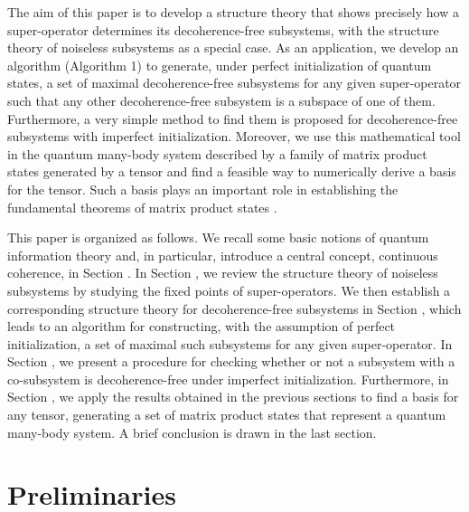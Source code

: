\documentclass[journal]{IEEEtran}
\begin{document}
The aim of this paper is to develop a structure theory that shows precisely how a super-operator determines its decoherence-free subsystems, with the structure theory of noiseless subsystems as a special case. As an application, we develop an algorithm (Algorithm 1) to generate, under perfect initialization of quantum states, a set of maximal decoherence-free subsystems for any given super-operator such that any other decoherence-free subsystem is a subspace of one of them. Furthermore, a very simple  method to find them is proposed for decoherence-free subsystems with imperfect initialization. 
Moreover, we use this mathematical tool in the quantum many-body system described by a family of matrix product states generated by a tensor and find a  feasible way to numerically derive a basis for the tensor. Such a basis plays an important role in establishing the fundamental theorems of matrix product states \cite{cirac2017matrix,cuevas2017irreducible}.

This paper is organized as follows. We recall some basic notions of quantum information theory and, in particular, introduce a central concept, continuous coherence,  in Section \uppercase\expandafter{}. In Section \uppercase\expandafter{}, we review the structure theory of noiseless subsystems by studying the fixed points of super-operators. We then establish a corresponding structure theory for decoherence-free subsystems in Section \uppercase\expandafter{}, which leads to an algorithm for constructing, with the assumption of perfect initialization, a set of maximal such subsystems  for any given super-operator. In Section \uppercase\expandafter{}, we present a procedure for checking whether or not a subsystem with a co-subsystem is decoherence-free under imperfect initialization. Furthermore, in Section \uppercase\expandafter{}, 
we apply the results obtained in the previous sections to find a basis for any tensor, generating a set of matrix product states that represent a quantum many-body system. A brief conclusion is drawn in the last section.

\section{Preliminaries}
\end{document}
